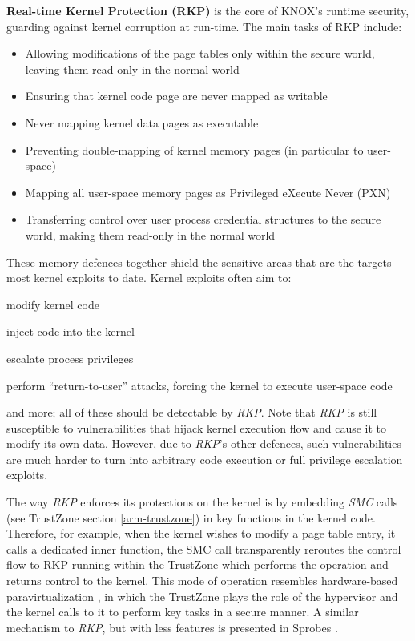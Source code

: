 \documentclass[11pt]{article}
\begin{document}
\textbf{Real-time Kernel Protection (RKP)} \cite{HypervisionAcrossWorlds} is the core of KNOX's runtime security, 
guarding against kernel corruption at run-time. The main tasks of RKP include:
\begin{itemize}[itemsep=0pt, topsep=1pt] \item Allowing modifications of the page tables only within the secure world, leaving them read-only in the normal world
  \item Ensuring that kernel code page are never mapped as writable
  \item Never mapping kernel data pages as executable
  \item Preventing double-mapping of kernel memory pages (in particular to user-space)
  \item Mapping all user-space memory pages as Privileged eXecute Never (PXN)
  \item Transferring control over user process credential structures to the secure world, making them read-only in the normal world
\end{itemize}
These memory defences together shield the sensitive areas that are the targets most kernel exploits to date. Kernel exploits often aim to:
\begin{inparaenum}
\item modify kernel code
\item inject code into the kernel
\item escalate process privileges
\item perform ``return-to-user'' attacks, forcing the kernel to execute user-space code
\end{inparaenum} and more; all of these should be detectable by \emph{RKP}.
Note that \emph{RKP} is still susceptible to vulnerabilities that hijack kernel execution flow and cause it to modify its own data. 
However, due to \emph{RKP}'s other defences, such vulnerabilities are much harder to turn into arbitrary code execution or full privilege escalation exploits.

The way \emph{RKP} enforces its protections on the kernel is by embedding \emph{SMC} calls 
(see TrustZone section \ref{arm-trustzone}) in key functions in the kernel code. Therefore, for example, when the kernel wishes to modify a page table entry, 
it calls a dedicated inner function, the SMC call transparently reroutes the control flow to RKP running within the TrustZone which performs the operation and returns control 
to the kernel.
This mode of operation resembles hardware-based paravirtualization \cite{EfficientVirtualization}, in which the TrustZone plays the role of the hypervisor and the kernel calls to it
to perform key tasks in a secure manner. A similar mechanism to \emph{RKP}, but with less features is presented in Sprobes \cite{Sprobes}.
\end{document}

